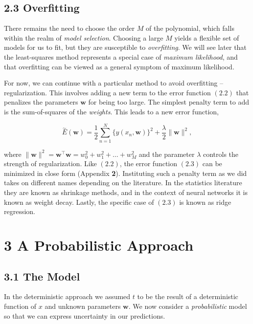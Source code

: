\documentclass[
  0.875em,
  letterpaper,
  DIV=11,
  numbers=noendperiod]{scrartcl}
\begin{document}
\hypertarget{overfitting}{%
\subsection{2.3 Overfitting}\label{overfitting}}

There remains the need to choose the order \(M\) of the polynomial,
which falls within the realm of \emph{model selection}. Choosing a large
\(M\) yields a flexible set of models for us to fit, but they are
susceptible to \emph{overfitting}. We will see later that the
least-squares method represents a special case of \emph{maximum
likelihood}, and that overfitting can be viewed as a general symptom of
maximum likelihood.

For now, we can continue with a particular method to avoid overfitting
-- regularization. This involves adding a new term to the error function
\((2.2)\) that penalizes the parameters \(\mathbf{w}\) for being too
large. The simplest penalty term to add is the sum-of-squares of the
\emph{weights}. This leads to a new error function,

\[
\overset{\sim}{E} (\mathbf{w}) = \frac{1}{2} \sum_{n=1}^N \{y(x_n, \mathbf{w}) \}^2 + \frac{\lambda}{2} \lVert \mathbf{w} \rVert^2 \tag{2.3},
\]

where
\(\lVert \mathbf{w} \rVert^2 = \mathbf{w}^\intercal \mathbf{w} = w_0^2 + w_1^2 + \dots + w_M^2\)
and the parameter \(\lambda\) controls the strength of regularization.
Like \((2.2)\), the error function \((2.3)\) can be minimized in close
form (Appendix \textbf{2}). Instituting such a penalty term as we did
takes on different names depending on the literature. In the statistics
literature they are known as shrinkage methods, and in the context of
neural networks it is known as weight decay. Lastly, the specific case
of \((2.3)\) is known as ridge regression.

\hypertarget{a-probabilistic-approach}{%
\section{3 A Probabilistic Approach}\label{a-probabilistic-approach}}

\hypertarget{the-model-1}{%
\subsection{3.1 The Model}\label{the-model-1}}

In the deterministic approach we assumed \(t\) to be the result of a
deterministic function of \(x\) and unknown parameters \(\mathbf{w}\).
We now consider a \emph{probabilistic} model so that we can express
uncertainty in our predictions.
\end{document}
